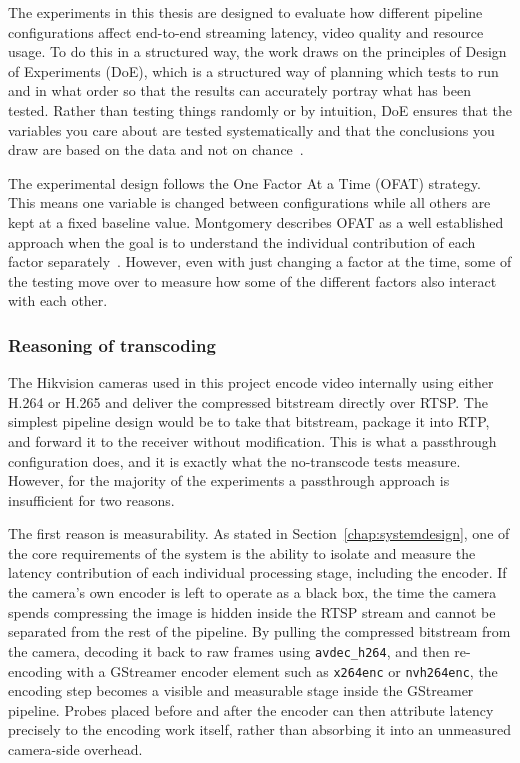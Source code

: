 The experiments in this thesis are designed to evaluate how different pipeline configurations affect end-to-end streaming latency, video quality and resource usage. To do this in a structured way, the work draws on the principles of Design of Experiments (DoE), which is a structured way of planning which tests to run and in what order so that the results can accurately portray what has been tested. Rather than testing things randomly or by intuition, DoE ensures that the variables you care about are tested systematically and that the conclusions you draw are based on the data and not on chance~\cite{montgomery2017}.

The experimental design follows the One Factor At a Time (OFAT) strategy. This means one variable is changed between configurations while all others are kept at a fixed baseline value. Montgomery describes OFAT as a well established approach when the goal is to understand the individual contribution of each factor separately~\cite{montgomery2017}. However, even with just changing a factor at the time, some of the testing move over to measure how some of the different factors also interact with each other.

\subsubsection{Reasoning of transcoding}
The Hikvision cameras used in this project encode video internally using either H.264 or H.265 and deliver the compressed bitstream directly over RTSP. The simplest pipeline design would be to take that bitstream, package it into RTP, and forward it to the receiver without modification. This is what a passthrough configuration does, and it is exactly what the no-transcode tests measure. However, for the majority of the experiments a passthrough approach is insufficient for two reasons.

The first reason is measurability. As stated in Section~\ref{chap:systemdesign}, one of the core requirements of the system is the ability to isolate and measure the latency contribution of each individual processing stage, including the encoder. If the camera's own encoder is left to operate as a black box, the time the camera spends compressing the image is hidden inside the RTSP stream and cannot be separated from the rest of the pipeline. By pulling the compressed bitstream from the camera, decoding it back to raw frames using \texttt{avdec\_h264}, and then re-encoding with a GStreamer encoder element such as \texttt{x264enc} or \texttt{nvh264enc}, the encoding step becomes a visible and measurable stage inside the GStreamer pipeline. Probes placed before and after the encoder can then attribute latency precisely to the encoding work itself, rather than absorbing it into an unmeasured camera-side overhead.

